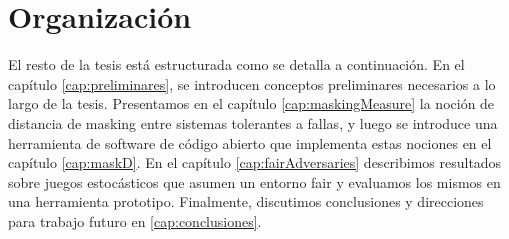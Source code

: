 \section{Organización}
\label{sec:intro.organizacion}
El resto de la tesis está estructurada como se detalla a continuación. 
En el capítulo \ref{cap:preliminares}, se introducen conceptos preliminares necesarios a lo largo de la tesis.
Presentamos en el capítulo \ref{cap:maskingMeasure} la noción de distancia de masking entre sistemas tolerantes a fallas, y luego se introduce una herramienta de software de código abierto que implementa estas nociones en el capítulo \ref{cap:maskD}.
En el capítulo \ref{cap:fairAdversaries} describimos resultados sobre juegos estocásticos que asumen un entorno fair y evaluamos los mismos en una herramienta prototipo.
Finalmente, discutimos conclusiones y direcciones para trabajo futuro en \ref{cap:conclusiones}.


